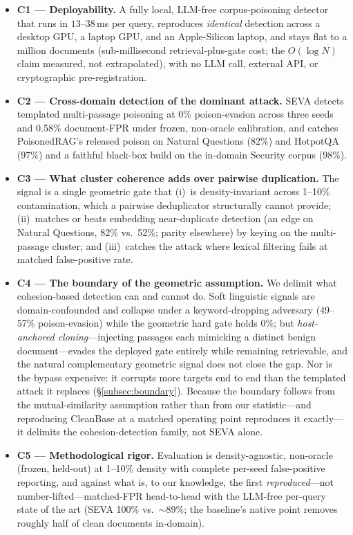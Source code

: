 \documentclass[conference]{IEEEtran}
\begin{document}
\begin{itemize}
\item \textbf{C1 --- Deployability.} A fully local, LLM-free corpus-poisoning detector
that runs in $13$--$38$\,ms per query, reproduces \emph{identical} detection across a desktop
GPU, a laptop GPU, and an Apple-Silicon laptop, and stays flat to a million documents
(sub-millisecond retrieval-plus-gate cost; the $O(\log N)$ claim measured, not extrapolated),
with no LLM call, external API, or cryptographic pre-registration.

\item \textbf{C2 --- Cross-domain detection of the dominant attack.} SEVA detects templated
multi-passage poisoning at 0\% poison-evasion across three seeds and 0.58\% document-FPR under
frozen, non-oracle calibration, and catches PoisonedRAG's released poison on Natural Questions
(82\%) and HotpotQA (97\%) and a faithful black-box build on the in-domain Security corpus
(98\%).

\item \textbf{C3 --- What cluster coherence adds over pairwise duplication.} The signal is a
single geometric gate that (i)~is density-invariant across 1--10\% contamination, which a
pairwise deduplicator structurally cannot provide; (ii)~matches or beats embedding
near-duplicate detection (an edge on Natural Questions, 82\% vs.\ 52\%; parity elsewhere) by
keying on the multi-passage cluster; and (iii)~catches the attack where lexical filtering fails
at matched false-positive rate.

\item \textbf{C4 --- The boundary of the geometric assumption.} We delimit what cohesion-based
detection can and cannot do. Soft linguistic signals are domain-confounded and collapse under a
keyword-dropping adversary (49--57\% poison-evasion) while the geometric hard gate holds $0\%$;
but \emph{host-anchored cloning}---injecting passages each mimicking a distinct benign
document---evades the deployed gate entirely while remaining retrievable, and the natural
complementary geometric signal does not close the gap. Nor is the bypass expensive: it corrupts
more targets end to end than the templated attack it replaces (\S\ref{subsec:boundary}). Because
the boundary follows from the mutual-similarity assumption rather than from our statistic---and
reproducing CleanBase at a matched operating point reproduces it exactly---it delimits the
cohesion-detection family, not SEVA alone.

\item \textbf{C5 --- Methodological rigor.} Evaluation is density-agnostic, non-oracle (frozen,
held-out) at 1--10\% density with complete per-seed false-positive reporting, and against what
is, to our knowledge, the first \emph{reproduced}---not number-lifted---matched-FPR head-to-head
with the LLM-free per-query state of the art (SEVA 100\% vs.\ $\sim$89\%; the baseline's native
point removes roughly half of clean documents in-domain).


\end{itemize}
\end{document}
